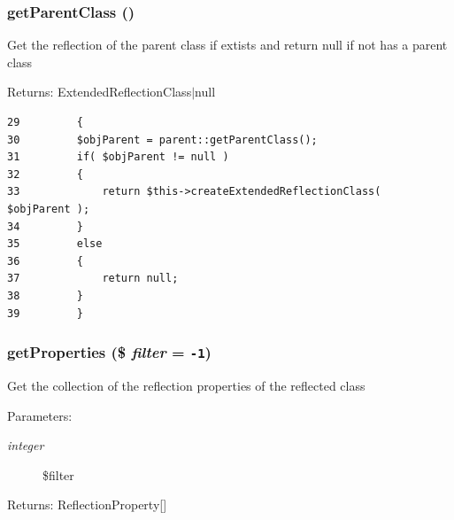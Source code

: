 \hypertarget{class_extended_reflection_class_0102234be653614459dc1588c13d6f2e}{
\subsubsection[{getParentClass}]{\setlength{\rightskip}{0pt plus 5cm}getParentClass ()}}
\label{class_extended_reflection_class_0102234be653614459dc1588c13d6f2e}


Get the reflection of the parent class if extists and return null if not has a parent class

\begin{Desc}
\item[Returns:]ExtendedReflectionClass$|$null \end{Desc}


\begin{Code}\begin{verbatim}29         {
30         $objParent = parent::getParentClass();
31         if( $objParent != null )
32         {
33             return $this->createExtendedReflectionClass(  $objParent );
34         }
35         else
36         {
37             return null;
38         }
39         }
\end{verbatim}
\end{Code}


\hypertarget{class_extended_reflection_class_343685a008d211bd41276c6042ea88ea}{
\subsubsection[{getProperties}]{\setlength{\rightskip}{0pt plus 5cm}getProperties (\$ {\em filter} = {\tt -1})}}
\label{class_extended_reflection_class_343685a008d211bd41276c6042ea88ea}


Get the collection of the reflection properties of the reflected class

\begin{Desc}
\item[Parameters:]
\begin{description}
\item[{\em integer}]\$filter \end{description}
\end{Desc}
\begin{Desc}
\item[Returns:]ReflectionProperty\mbox{[}\mbox{]} \end{Desc}


